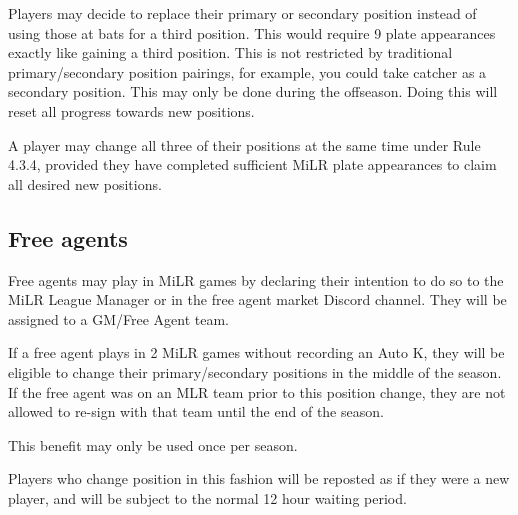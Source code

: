 \begin{deepEnumerate}
    \item Players may decide to replace their primary or secondary position instead of using those at bats for a third position. 
    This would require 9 plate appearances exactly like gaining a third position. This is not restricted by traditional primary/secondary position pairings, 
    for example, you could take catcher as a secondary position. This may only be done during the offseason. Doing this will reset all progress towards new positions.
    \begin{deepEnumerate}
        \item A player may change all three of their positions at the same time under Rule 4.3.4, provided they have completed sufficient MiLR plate appearances
        to claim all desired new positions.
    \end{deepEnumerate}
\end{deepEnumerate}

\subsection{Free agents}
\label{sec:MiLR FA}
\begin{deepEnumerate}
    \item Free agents may play in MiLR games by declaring their intention to do so to the MiLR League Manager or in the free agent market Discord channel. 
    They will be assigned to a GM/Free Agent team.
    \item If a free agent plays in 2 MiLR games without recording an Auto K, they will be eligible to change their primary/secondary positions in the middle of the season. 
    If the free agent was on an MLR team prior to this position change, they are not allowed to re-sign with that team until the end of the season.
    \begin{deepEnumerate}
        \item This benefit may only be used once per season.
        \item Players who change position in this fashion will be reposted as if they were a new player, and will be subject to the normal 12 hour waiting period.        
    \end{deepEnumerate}
\end{deepEnumerate}

